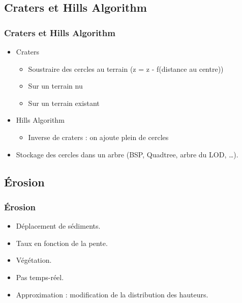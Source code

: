 \documentclass{beamer}
\begin{document}
\subsection{Craters et Hills Algorithm}
\begin{frame}
  \frametitle{Craters et Hills Algorithm}
  \begin{itemize}
  \item Craters
    \begin{itemize}
    \item Soustraire des cercles au terrain (z = z - f(distance au centre))
    \item Sur un terrain nu
    \item Sur un terrain existant
    \end{itemize}
  \item Hills Algorithm
    \begin{itemize}
    \item Inverse de craters : on ajoute plein de cercles
    \end{itemize}
  \item Stockage des cercles dans un arbre (BSP, Quadtree, arbre du LOD, \dots).
  \end{itemize}
\end{frame}

\subsection{Érosion}

\begin{frame}
  \frametitle{Érosion}
  \begin{itemize}
  \item Déplacement de sédiments.
  \item Taux en fonction de la pente.
  \item Végétation.
  \item Pas temps-réel.
  \item Approximation : modification de la distribution des hauteurs.
  \end{itemize}
\end{frame}
\end{document}
